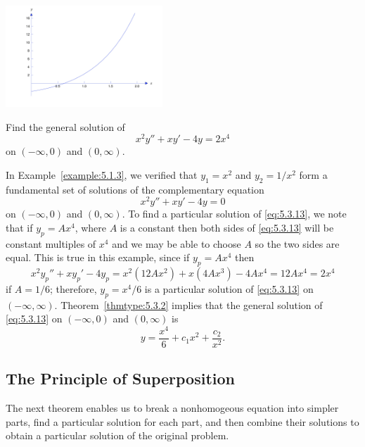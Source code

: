 \documentclass{ximera}
\begin{document}
\begin{example}
\begin{explanation}
\begin{image}
  \includegraphics[height=1.5in]{fig050302.jpg} 
\end{image}

\end{explanation}
\end{example}

\begin{example}\label{example:5.3.3} 
Find the general solution of
\begin{equation} \label{eq:5.3.13}
x^2y''+xy'-4y=2x^4
\end{equation}
on $(-\infty,0)$ and $(0,\infty)$.


\begin{explanation}
In Example~\ref{example:5.1.3},  we verified that $y_1=x^2$ and $y_2=1/x^2$
form a fundamental set of solutions of the complementary equation
$$
x^2y''+xy'-4y=0
$$
on $(-\infty,0)$ and $(0,\infty)$.  To find a particular solution of
\eqref{eq:5.3.13}, we note that if
$y_p=Ax^4$, where $A$ is a constant then  both sides of \eqref{eq:5.3.13}
will be constant
multiples  of $x^4$ and  we may be able to choose  $A$ so the two sides
are equal. This is true in this example, since if $y_p=Ax^4$ then
$$
x^2y_p''+xy_p'-4y_p=x^2(12Ax^2)+x(4Ax^3)-4Ax^4=12Ax^4=2x^4
$$
if $A=1/6$;  therefore, $y_p=x^4/6$ is a particular solution of
\eqref{eq:5.3.13} on  $(-\infty,\infty)$.
Theorem~\ref{thmtype:5.3.2} implies that the general solution of
\eqref{eq:5.3.13} on  $(-\infty,0)$ and  $(0,\infty)$ is
$$
y=\frac{x^4}{6}+c_1x^2+\frac{c_2}{x^2}.
$$
\end{explanation}
\end{example}

\subsection*{The Principle of Superposition}

The next theorem enables us to break a nonhomogeous equation into
simpler parts, find a particular solution for each part, and then
combine their solutions to obtain a particular solution of the
original problem.
\end{document}
